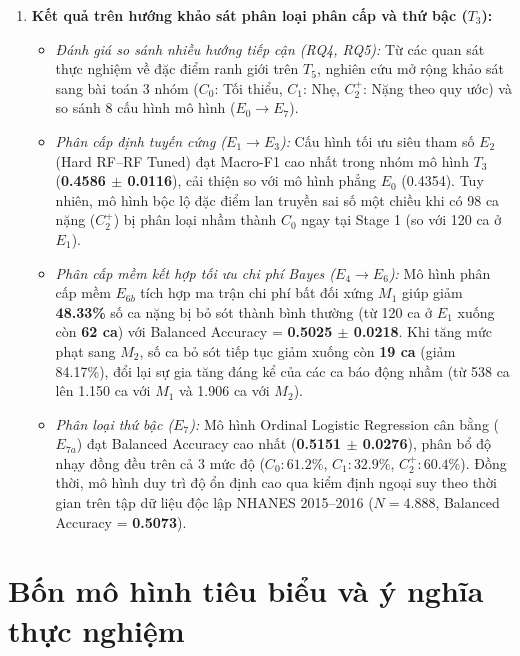\begin{enumerate}
    \item \textbf{Kết quả trên hướng khảo sát phân loại phân cấp và thứ bậc ($T_3$):}
    \begin{itemize}
        \item \textit{Đánh giá so sánh nhiều hướng tiếp cận (RQ4, RQ5):} Từ các quan sát thực nghiệm về đặc điểm ranh giới trên $T_5$, nghiên cứu mở rộng khảo sát sang bài toán 3 nhóm ($C_0$: Tối thiểu, $C_1$: Nhẹ, $C_2^+$: Nặng theo quy ước) và so sánh 8 cấu hình mô hình ($E_0 \to E_7$).
        \item \textit{Phân cấp định tuyến cứng ($E_1 \to E_3$):} Cấu hình tối ưu siêu tham số $E_2$ (Hard RF--RF Tuned) đạt Macro-F1 cao nhất trong nhóm mô hình $T_3$ (\textbf{0.4586 $\pm$ 0.0116}), cải thiện so với mô hình phẳng $E_0$ (0.4354). Tuy nhiên, mô hình bộc lộ đặc điểm lan truyền sai số một chiều khi có 98 ca nặng ($C_2^+$) bị phân loại nhầm thành $C_0$ ngay tại Stage 1 (so với 120 ca ở $E_1$).
        \item \textit{Phân cấp mềm kết hợp tối ưu chi phí Bayes ($E_4 \to E_6$):} Mô hình phân cấp mềm $E_{6b}$ tích hợp ma trận chi phí bất đối xứng $M_1$ giúp giảm \textbf{48.33\%} số ca nặng bị bỏ sót thành bình thường (từ 120 ca ở $E_1$ xuống còn \textbf{62 ca}) với Balanced Accuracy = \textbf{0.5025 $\pm$ 0.0218}. Khi tăng mức phạt sang $M_2$, số ca bỏ sót tiếp tục giảm xuống còn \textbf{19 ca} (giảm 84.17\%), đổi lại sự gia tăng đáng kể của các ca báo động nhầm (từ 538 ca lên 1.150 ca với $M_1$ và 1.906 ca với $M_2$).
        \item \textit{Phân loại thứ bậc ($E_7$):} Mô hình Ordinal Logistic Regression cân bằng ($E_{7a}$) đạt Balanced Accuracy cao nhất (\textbf{0.5151 $\pm$ 0.0276}), phân bổ độ nhạy đồng đều trên cả 3 mức độ ($C_0: 61.2\%$, $C_1: 32.9\%$, $C_2^+: 60.4\%$). Đồng thời, mô hình duy trì độ ổn định cao qua kiểm định ngoại suy theo thời gian trên tập dữ liệu độc lập NHANES 2015--2016 ($N = 4.888$, Balanced Accuracy = \textbf{0.5073}).
    \end{itemize}
\end{enumerate}

\section{Bốn mô hình tiêu biểu và ý nghĩa thực nghiệm}
\label{sec:khuyen-nghi-mo-hinh}

